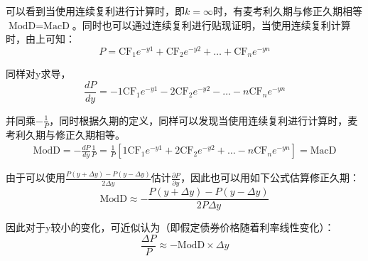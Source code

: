 \documentclass[11pt]{article}
\begin{document}
可以看到当使用连续复利进行计算时，即$k=\infty$时，有麦考利久期与修正久期相等$\text{ModD} = \text{MacD}$。同时也可以通过连续复利进行贴现证明，当使用连续复利计算时，由上可知：
\begin{equation*}
    P = \text{CF}_1 e^{-y1} + \text{CF}_2 e^{-y2} + \dots + \text{CF}_n e^{-yn}
\end{equation*}

同样对y求导，
\begin{equation*}
    \frac{dP}{dy} = -1 \text{CF}_1 e^{-y1} -2 \text{CF}_2 e^{-y2} - \dots -n \text{CF}_n e^{-yn}
\end{equation*}

并同乘$-\frac{1}{P}$，同时根据久期的定义，同样可以发现当使用连续复利进行计算时，麦考利久期与修正久期相等。
\begin{align*}
    \text{ModD} = - \frac{dP}{dy} \frac{1}{P} = \frac{1}{P} \left[ 1 \text{CF}_1 e^{-y1} +2 \text{CF}_2 e^{-y2} + \dots -n \text{CF}_n e^{-yn} \right]
    = \text{MacD}
\end{align*}

由于可以使用$\frac{P(y+\Delta y) - P(y-\Delta y)}{2\Delta y}$估计$\frac{\partial P}{\partial y}$，因此也可以用如下公式估算修正久期：
\begin{equation*}
    \text{ModD} \approx - \frac{P(y+\Delta y) - P(y-\Delta y)}{2 P \Delta y}
\end{equation*}

因此对于y较小的变化，可近似认为（即假定债券价格随着利率线性变化）：
\begin{equation*}
    \frac{\Delta P}{P} \approx - \text{ModD} \times \Delta y
\end{equation*}
\end{document}
